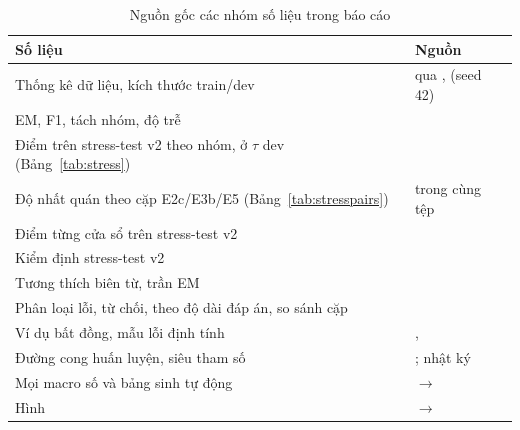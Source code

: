 \begin{table}[H]
\centering
\caption{Nguồn gốc các nhóm số liệu trong báo cáo}
\label{tab:trace}
\renewcommand{\arraystretch}{1.2}
\small
\begin{tabularx}{\textwidth}{@{}L L@{}}
\toprule
\textbf{Số liệu} & \textbf{Nguồn} \\
\midrule
Thống kê dữ liệu, kích thước train/dev &  qua ,  (seed 42) \\
EM, F1, tách nhóm, độ trễ &  \\
Điểm trên stress-test v2 theo nhóm, ở $\tau$ dev (Bảng~\ref{tab:stress}) &  \\
Độ nhất quán theo cặp E2c/E3b/E5 (Bảng~\ref{tab:stresspairs}) &  trong cùng tệp \\
Điểm từng cửa sổ trên stress-test v2 &  \\
Kiểm định stress-test v2 &  \\
Tương thích biên từ, trần EM &  \\
Phân loại lỗi, từ chối, theo độ dài đáp án, so sánh cặp &  \\
Ví dụ bất đồng, mẫu lỗi định tính & ,  \\
Đường cong huấn luyện, siêu tham số & ; nhật ký  \\
Mọi macro số và bảng sinh tự động &  $\to$  \\
Hình &  $\to$  \\
\bottomrule
\end{tabularx}
\end{table}
